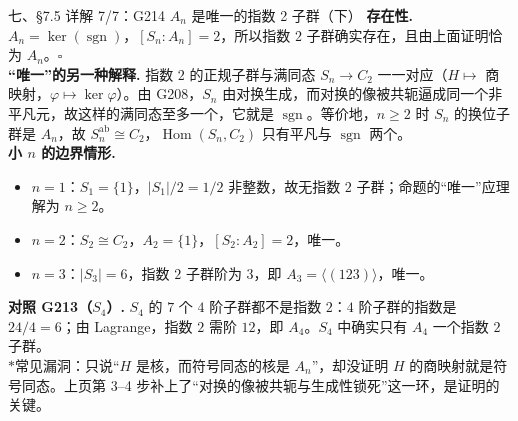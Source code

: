 \documentclass[aspectratio=169,10pt,fontset=none]{ctexbeamer}
\newcommand{\key}[1]{\textcolor{ink}{\bfseries #1}}
\newcommand{\starpt}{\textcolor{accent}{\bfseries$\ast$}}
\begin{document}
\begin{frame}[t]{七、\S7.5 详解 7/7：G214 $A_n$ 是唯一的指数 2 子群（下）}
\scriptsize
\setlength{\parskip}{1pt}
\key{存在性.} $A_n=\ker(\operatorname{sgn})$，$[S_n:A_n]=2$，所以指数 $2$ 子群确实存在，且由上面证明恰为 $A_n$。$\square$\\
\key{“唯一”的另一种解释.} 指数 $2$ 的正规子群与满同态 $S_n\to C_2$ 一一对应（$H\mapsto$ 商映射，$\varphi\mapsto\ker\varphi$）。由 G208，$S_n$ 由对换生成，而对换的像被共轭逼成同一个非平凡元，故这样的满同态至多一个，它就是 $\operatorname{sgn}$。等价地，$n\ge2$ 时 $S_n$ 的换位子群是 $A_n$，故 $S_n^{\mathrm{ab}}\cong C_2$，$\operatorname{Hom}(S_n,C_2)$ 只有平凡与 $\operatorname{sgn}$ 两个。\\
\key{小 $n$ 的边界情形.}
\begin{itemize}\setlength{\itemsep}{0pt}\setlength{\parskip}{0pt}
  \item $n=1$：$S_1=\{1\}$，$|S_1|/2=1/2$ 非整数，故无指数 $2$ 子群；命题的“唯一”应理解为 $n\ge2$。
  \item $n=2$：$S_2\cong C_2$，$A_2=\{1\}$，$[S_2:A_2]=2$，唯一。
  \item $n=3$：$|S_3|=6$，指数 $2$ 子群阶为 $3$，即 $A_3=\langle(123)\rangle$，唯一。
\end{itemize}
\key{对照 G213（$S_4$）.} $S_4$ 的 $7$ 个 $4$ 阶子群都不是指数 $2$：$4$ 阶子群的指数是 $24/4=6$；由 Lagrange，指数 $2$ 需阶 $12$，即 $A_4$。$S_4$ 中确实只有 $A_4$ 一个指数 $2$ 子群。\\
\starpt 常见漏洞：只说“$H$ 是核，而符号同态的核是 $A_n$”，却没证明 $H$ 的商映射就是符号同态。上页第 3--4 步补上了“对换的像被共轭与生成性锁死”这一环，是证明的关键。
\end{frame}
\end{document}
